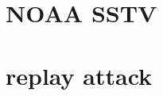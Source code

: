 \documentclass[conference]{IEEEtran}
\begin{document}
\section{NOAA SSTV} %

\section{replay attack} %
\label{replayattack}




\end{document}
